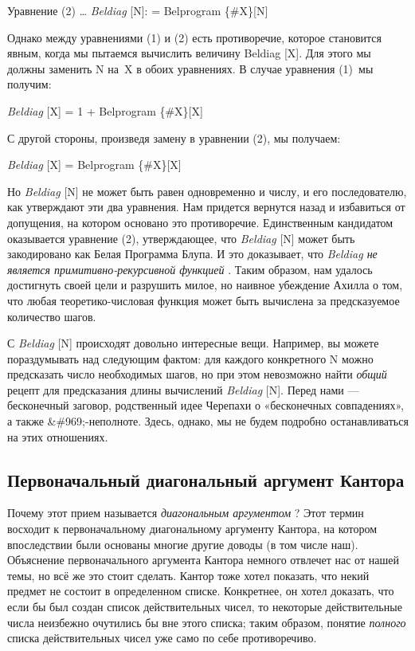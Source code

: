 \documentclass[../main.tex]{subfiles}
\begin{document}
Уравнение (2) \ldots{} \emph{Beldiag} {[}N{]}: = Belprogram \{\#X\}{[}N{]}

Однако между уравнениями (1) и (2) есть противоречие, которое становится явным, когда мы пытаемся вычислить величину Beldiag {[}X{]}. Для этого мы должны заменить N на~X в обоих уравнениях. В случае уравнения (1)~мы получим:

\emph{Beldiag} {[}X{]} = 1 + Belprogram \{\#X\}{[}X{]}

С другой стороны, произведя замену в уравнении (2), мы получаем:

\emph{Beldiag} {[}X{]} = Belprogram \{\#X\}{[}X{]}

Но \emph{Beldiag} {[}N{]} не может быть равен одновременно и числу, и его последователю, как утверждают эти два уравнения. Нам придется вернутся назад и избавиться от допущения, на котором основано это противоречие. Единственным кандидатом оказывается уравнение (2), утверждающее, что \emph{Beldiag} {[}N{]} может быть закодировано как Белая Программа Блупа. И это доказывает, что \emph{Beldiag не является примитивно-рекурсивной функцией} . Таким образом, нам удалось достигнуть своей цели и разрушить милое, но наивное убеждение Ахилла о том, что любая теоретико-числовая функция может быть вычислена за предсказуемое количество шагов.

С \emph{Beldiag} {[}N{]} происходят довольно интересные вещи. Например, вы можете пораздумывать над следующим фактом: для каждого конкретного N можно предсказать число необходимых шагов, но при этом невозможно найти \emph{общий} рецепт для предсказания длины вычислений \emph{Beldiag} {[}N{]}. Перед нами --- бесконечный заговор, родственный идее Черепахи о «бесконечных совпадениях», а также \&\#969;-неполноте. Здесь, однако, мы не будем подробно останавливаться на этих отношениях.


\subsection{Первоначальный диагональный аргумент Кантора}

Почему этот прием называется \emph{диагональным аргументом} ? Этот термин восходит к первоначальному диагональному аргументу Кантора, на котором впоследствии были основаны многие другие доводы (в том числе наш). Объяснение первоначального аргумента Кантора немного отвлечет нас от нашей темы, но всё же это стоит сделать. Кантор тоже хотел показать, что некий предмет не состоит в определенном списке. Конкретнее, он хотел доказать, что если бы был создан список действительных чисел, то некоторые действительные числа неизбежно очутились бы вне этого списка; таким образом, понятие \emph{полного} списка действительных чисел уже само по себе противоречиво.
\end{document}

